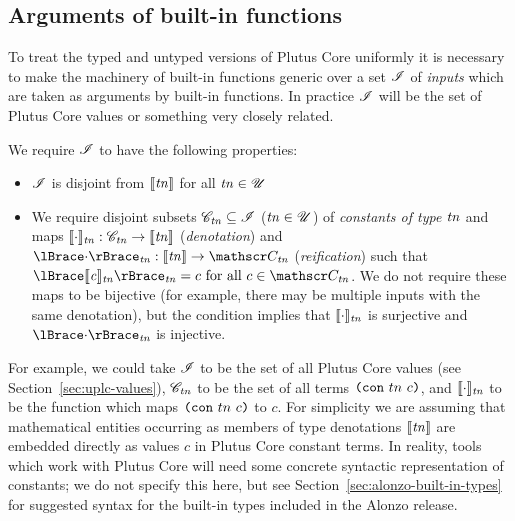 \subsection{Arguments of built-in functions}
\label{sec:builtin-inputs}
To treat the typed and untyped versions of Plutus Core uniformly it is necessary
to make the machinery of built-in functions generic over a set $\mathscr{I}$ of
\textit{inputs} which are taken as arguments by built-in functions.  In practice
$\mathscr{I}$ will be the set of Plutus Core values or something very closely
related.

\indent We require $\mathscr{I}$ to have the following properties:
\begin{itemize}
\item $\mathscr{I}$ is disjoint from $\llbracket\mathit{\mathit{tn}}\rrbracket$ for all $\mathit{tn} \in \mathscr{U}$
\item We require disjoint subsets $\mathscr{C}_{\mathit{tn}} \subseteq \mathscr{I}$ ($\mathit{tn} \in \mathscr{U}$)
  of \textit{constants of type $\mathit{tn}$} and maps $\llbracket\mathit{\cdot}\rrbracket_{\mathit{tn}}: \mathscr{C}_{\mathit{tn}}
  \rightarrow \llbracket\mathit{\mathit{tn}}\rrbracket$ (\textit{denotation}) and $\reify{\cdot}_{\tn}:
  \denote{\tn} \rightarrow \Con{\tn}$ (\textit{reification}) such that
  $\reify{\denote{c}_{\tn}}_{\tn} = c \mbox{ for all } c \in \Con{\tn}$.  We do
  not require these maps to be bijective (for example, there may be multiple
  inputs with the same denotation), but the condition implies that
  $\llbracket\mathit{\cdot}\rrbracket_{\mathit{tn}}$ is surjective and $\reify{\cdot}_{\tn}$ is injective.
\end{itemize}


\noindent For example, we could take $\mathscr{I}$ to be the set of all Plutus Core
values (see Section~\ref{sec:uplc-values}), $\mathscr{C}_{\mathit{tn}}$ to be the set of all
terms $\texttt{(} \texttt{con} ~ tn ~ c \texttt{)}$, and $\llbracket\mathit{\cdot}\rrbracket_{\mathit{tn}}$ to be the function which maps
$\texttt{(} \texttt{con} ~ tn ~ c \texttt{)}$ to $c$.  For simplicity we are assuming that mathematical entities
occurring as members of type denotations $\llbracket\mathit{\mathit{tn}}\rrbracket$ are embedded directly as
values $c$ in Plutus Core constant terms. In reality, tools which work with
Plutus Core will need some concrete syntactic representation of constants;
we do not specify this here, but see Section~\ref{sec:alonzo-built-in-types} for
suggested syntax for the built-in types included in the Alonzo release.

